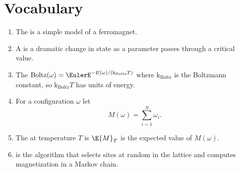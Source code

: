\documentclass[12pt]{article}
\begin{document}
\hr

\section*{Vocabulary}
\begin{enumerate}
    \item
        The  is a simple model of a ferromagnet.
    \item
        A  is a dramatic change in state as a
        parameter passes through a critical value.
    \item
        The  \(
        \operatorname{Boltz}
        (\omega) = \EulerE^{-E(\omega)/(\text{k}_{\text{Boltz}} T)} \)
        where \( \text{k}_{\text{Boltz}} \) is the Boltzmann constant,
        so \( \text{k}_{\text{Boltz}} T \) has units of energy.
    \item
        For a configuration \( \omega \) let
        \[
            M(\omega) = \sum\limits_{i=1}^N \omega_{i}.
        \]
    \item
        The  at temperature \( T \) is \( \E{M}_T \)
        is the expected value of \( M(\omega) \).
    \item
         is the algorithm that selects sites at
        random in the lattice and computes magnetization in a Markov
        chain.
\end{enumerate}

\hr
\end{document}
